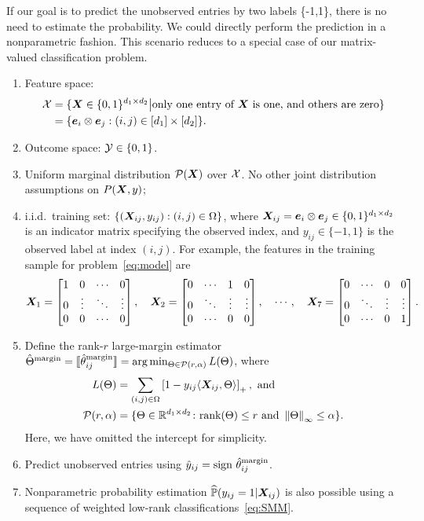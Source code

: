 \documentclass[11pt]{article}
\theoremstyle{plain}
\theoremstyle{definition}
\def\marginest{\hat \Theta^{\textup{margin}}}
\def\sign{\textup{sign }}
\begin{document}
If our goal is to predict the unobserved entries by two labels \{-1,1\}, there is no need to estimate the probability. We could directly perform the prediction in a nonparametric fashion. This scenario reduces to a special case of our matrix-valued classification problem. 
\begin{enumerate}
\item Feature space: 
\begin{align}
\mathcal{X}&=\{\bm X\in\{0,1\}^{d_1\times d_2}\big| \text{only one entry of $\bm X$ is one, and others are zero}\} \\
&= \{\bm{e}_i\otimes \bm{e}_j: (i,j)\in[d_1]\times[d_2]\}.
\end{align}
\item Outcome space: $\mathcal{Y}\in\{0,1\}$.
\item Uniform marginal distribution $\mathcal{P}(\bm X)$ over $\mathcal{X}$. No other joint distribution assumptions on $P(\bm X,y)$; 
\item i.i.d.\ training set: $\{(\bm X_{ij}, y_{ij}): (i,j)\in\Omega\}$, where $\bm X_{ij}=\bm{e}_i\otimes \bm{e}_j \in \{0,1\}^{d_1\times d_2}$ is an indicator matrix specifying the observed index, and $y_{ij}\in\{-1,1\}$ is the observed label at index $(i,j)$. 
For example, the features in the training sample for problem~\eqref{eq:model} are
\[
\bm X_1=\begin{bmatrix}
1&0&\cdots&0\\
0&\vdots&\ddots&\vdots\\
0&0&\cdots&0\\
\end{bmatrix},\quad
\bm X_2=\begin{bmatrix}
0&\cdots&1&0\\
0&\ddots&\vdots&\vdots\\
0&\cdots&0&0\\
\end{bmatrix}, \quad \cdots,\quad 
\bm X_7=\begin{bmatrix}
0&\cdots&0
&0\\
0&\ddots&\vdots&\vdots\\
0&\cdots&0&1\\
\end{bmatrix}.
\]

\item Define the rank-$r$ large-margin estimator $\marginest=\entry{\hat \theta^{\text{margin}}_{ij}}=\arg\min_{\Theta\in\tP(r,\alpha)}L(\Theta)$, where
\begin{align}\label{eq:SMM}
L(\Theta) &= \sum_{(i,j)\in\Omega}\left[1-y_{ij}\langle \bm X_{ij}, \Theta \rangle\right]_{+}, \ \text{and}\ \\
\mathcal{P}(r,\alpha)&=\{\Theta\in\mathbb{R}^{d_1\times d_2}\colon \text{rank}(\Theta)\leq r\ \text{and}\ \left\lVert\Theta\right\rVert_\infty\leq \alpha\}.
\end{align}
Here, we have omitted the intercept for simplicity. 
\item Predict unobserved entries using $\hat y_{ij} = \sign\hat \theta^{\text{margin}}_{ij}$. 
\item Nonparametric probability estimation $\widehat{\mathbb{P}}(y_{ij}=1|\bm X_{ij})$ is also possible using a sequence of weighted low-rank classifications~\eqref{eq:SMM}. 
\end{enumerate}
\end{document}
